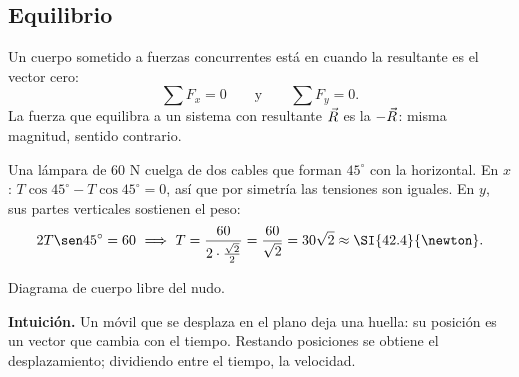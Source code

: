 \documentclass[11pt,a4paper]{article}
\let\nivelbase\nivel
\renewcommand{\nivel}[2]{\Needspace{10\baselineskip}\nivelbase{#1}{#2}}
\begin{document}
\subsection{Equilibrio}
\begin{propiedad}
Un cuerpo sometido a fuerzas concurrentes está en  cuando la resultante es el vector cero:
\[ \sum F_x=0\qquad\text{y}\qquad\sum F_y=0 . \]
La fuerza que equilibra a un sistema con resultante $\vec{R}$ es la  $-\vec{R}$: misma magnitud, sentido contrario.
\end{propiedad}

\begin{minipage}[c]{0.56\linewidth}
\begin{ejemplo}
Una lámpara de $60$ N cuelga de dos cables que forman $45^\circ$ con la horizontal. En $x$:
$T\cos45^\circ-T\cos45^\circ=0$, así que por simetría las tensiones son iguales. En $y$, sus partes verticales
sostienen el peso:
\[ 2T\sen45^\circ=60\ \Longrightarrow\ T=\frac{60}{2\cdot\frac{\sqrt2}{2}}=\frac{60}{\sqrt2}=30\sqrt2\approx\SI{42.4}{\newton}. \]
\end{ejemplo}
\end{minipage}\hfill
\begin{minipage}[c]{0.4\linewidth}\centering
{}

{\small\color{zmute}Diagrama de cuerpo libre del nudo.}
\end{minipage}


\textbf{Intuición.} Un móvil que se desplaza en el plano deja una huella: su posición es un vector que cambia con
el tiempo. Restando posiciones se obtiene el desplazamiento; dividiendo entre el tiempo, la velocidad.
\end{document}
